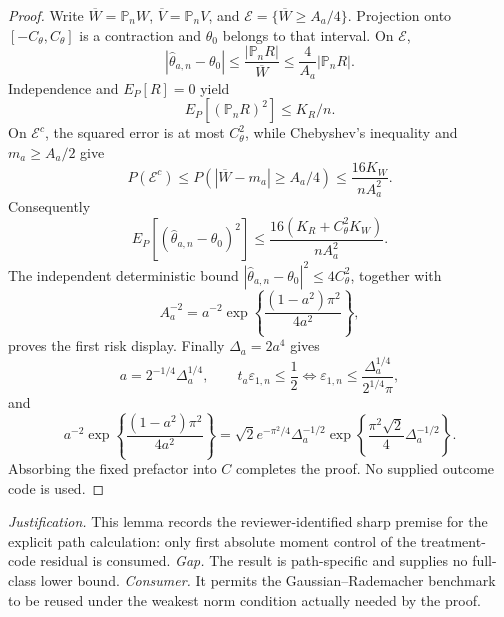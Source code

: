 \documentclass{article}
\begin{document}
\begin{proof}
Write \(\overline W=\mathbb P_nW\), \(\overline V=\mathbb P_nV\), and \(\mathcal E=\{\overline W\ge A_a/4\}\).  Projection onto \([-C_{\theta},C_{\theta}]\) is a contraction and \(\theta_0\) belongs to that interval.  On \(\mathcal E\),
\[
 |\widehat\theta_{a,n}-\theta_0|
 \le\frac{|\mathbb P_nR|}{\overline W}
 \le\frac4{A_a}|\mathbb P_nR|.
\]
Independence and \(E_P[R]=0\) yield
\[
 E_P[(\mathbb P_nR)^2]\le K_R/n.
\]
On \(\mathcal E^c\), the squared error is at most \(C_{\theta}^2\), while Chebyshev's inequality and \(m_a\ge A_a/2\) give
\[
 P(\mathcal E^c)
 \le P(|\overline W-m_a|\ge A_a/4)
 \le\frac{16K_W}{nA_a^2}.
\]
Consequently
\[
 E_P[(\widehat\theta_{a,n}-\theta_0)^2]
 \le\frac{16(K_R+C_{\theta}^2K_W)}{nA_a^2}.
\]
The independent deterministic bound \(|\widehat\theta_{a,n}-\theta_0|^2\le4C_{\theta}^2\), together with
\[
 A_a^{-2}=a^{-2}\exp\!\left\{\frac{(1-a^2)\pi^2}{4a^2}\right\},
\]
proves the first risk display.  Finally \(\Delta_a=2a^4\) gives
\[
 a=2^{-1/4}\Delta_a^{1/4},
 \qquad
 t_a\varepsilon_{1,n}\le\frac12
 \Longleftrightarrow
 \varepsilon_{1,n}\le\frac{\Delta_a^{1/4}}{2^{1/4}\pi},
\]
and
\[
 a^{-2}\exp\!\left\{\frac{(1-a^2)\pi^2}{4a^2}\right\}
 =\sqrt2e^{-\pi^2/4}\Delta_a^{-1/2}
 \exp\!\left\{\frac{\pi^2\sqrt2}{4}\Delta_a^{-1/2}\right\}.
\]
Absorbing the fixed prefactor into \(C\) completes the proof.  No supplied outcome code is used.
\end{proof}
\par\smallskip\noindent \textit{Justification.} This lemma records the reviewer-identified sharp premise for the explicit path calculation: only first absolute moment control of the treatment-code residual is consumed. \textit{Gap.} The result is path-specific and supplies no full-class lower bound. \textit{Consumer.} It permits the Gaussian--Rademacher benchmark to be reused under the weakest norm condition actually needed by the proof.
\end{document}
